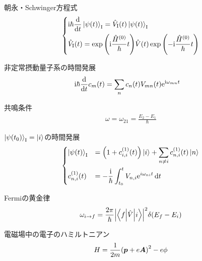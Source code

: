 \documentclass{report}
\begin{document}
\begin{itembox}[l]{朝永・Schwinger方程式}
  \begin{align}
    \begin{dcases}
      \mathrm{i}\hbar\dv{t}\ket{\psi(t)}_{\mathrm{I}} = \hat{V}_{\mathrm{I}}(t)\ket{\psi(t)}_{\mathrm{I}} \label{tomonaga-schwinger}\\
      \hat{V}_{\mathrm{I}}(t) = \exp\qty(\mathrm{i}\frac{\hat{H}^{(0)}}{\hbar}t)\hat{V}(t)\exp\qty(-\mathrm{i}\frac{\hat{H}^{(0)}}{\hbar}t)
    \end{dcases}
  \end{align}
\end{itembox}

\begin{itembox}[l]{非定常摂動量子系の時間発展}
  \begin{align}
    \mathrm{i}\hbar\dv{t}c_m(t) &= \sum_{n}c_n(t)V_{mn}(t)\mathrm{e}^{\mathrm{i}\omega_{mn}t}\label{cnt-eq}
  \end{align}
\end{itembox}

\begin{itembox}[l]{共鳴条件}
  \begin{align}
    \omega = \omega_{21} = \frac{E_2 - E_1}{\hbar}
  \end{align}
\end{itembox}

\begin{itembox}[l]{$\ket{\psi(t_0)}_{\mathrm{I}} = \ket{i}$の時間発展}
  \begin{align}
    \begin{dcases}
      \ket{\psi(t)}_{\mathrm{I}}& = \qty(1 + c_{i, i}^{(1)}(t))\ket{i} + \sum_{n\neq i}c_{n, i}^{(1)}(t)\ket{n}\label{interaction-picture-time-development-of-qc} \\
      c_{n, i}^{(1)}(t) &= -\frac{\mathrm{i}}{\hbar}\int_{t_0}^{t}V_{n, i}\mathrm{e}^{i\omega_{ni}t}\dd{t}
    \end{dcases}
  \end{align}
\end{itembox}

\begin{itembox}[l]{Fermiの黄金律}
  \begin{align}
    \omega_{i\to f} = \frac{2\pi}{\hbar}\abs{\mel**{f}{\hat{V}}{i}}^2\delta(E_f - E_i)
  \end{align}
\end{itembox}

\begin{itembox}[l]{電磁場中の電子のハミルトニアン}
  \begin{align}
    H = \frac{1}{2m}\qty(\bm{p} + e\bm{A})^2 - e\phi\label{hamiltonian-in-electro-magnetic-field-cm}
  \end{align}
\end{itembox}
\end{document}
